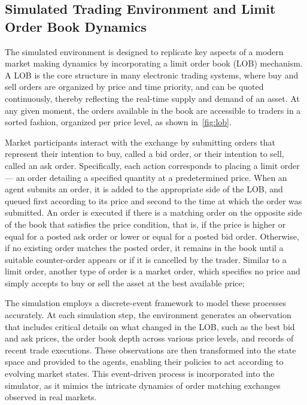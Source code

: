 \documentclass[11pt]{article}
\begin{document}
    \subsection{Simulated Trading Environment and Limit Order Book Dynamics}
    \label{subsec:environment}
    The simulated environment is designed to replicate key aspects of a modern market making dynamics by 
    incorporating a limit order book (LOB) mechanism.
    A LOB is the core structure in many electronic trading systems, where buy and sell orders are organized by price and time priority,
    and can be quoted continuously, thereby reflecting the real-time supply and demand of an asset.
    At any given moment, the orders available in the book are accessible to traders in a sorted fashion, organized per price level,
    as shown in~\cref{fig:lob}.

    Market participants interact with the exchange by submitting orders that represent their intention to buy, called a bid order,
    or their intention to sell, called an ask order.
    Specifically, each action corresponds to placing a limit order --- an order detailing a specified quantity at a predetermined price.
    When an agent submits an order, it is added to the appropriate side of the LOB, 
    and queued first according to its price and second to the time at which the order was submitted.
    An order is executed if there is a matching order on the opposite side of the book that satisfies the price condition,
    that is, if the price is higher or equal for a posted ask order or lower or equal for a posted bid order.
    Otherwise, if no existing order matches the posted order, 
    it remains in the book until a suitable counter-order appears or if it is cancelled by the trader.
    Similar to a limit order, another type of order is a market order, 
    which specifies no price and simply accepts to buy or sell the asset at the best available price; 

    The simulation employs a discrete-event framework to model these processes accurately.
    At each simulation step, the environment generates an observation that includes critical details on what changed in the LOB, 
    such as the best bid and ask prices, the order book depth across various price levels, and records of recent trade executions.
    These observations are then transformed into the state space and provided to the agents, 
    enabling their policies to act according to evolving market states.
    This event-driven process is incorporated into the simulator, 
    as it mimics the intricate dynamics of order matching exchanges observed in real markets.
\end{document}
